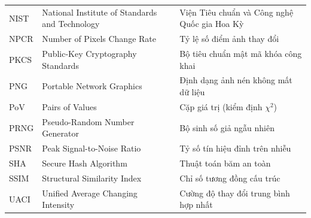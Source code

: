{\begin{longtable}{@{}P{2.6cm}P{6.4cm}P{6.0cm}@{}}
NIST    & National Institute of Standards and Technology & Viện Tiêu chuẩn và Công nghệ Quốc gia Hoa Kỳ\\
NPCR    & Number of Pixels Change Rate & Tỷ lệ số điểm ảnh thay đổi\\
PKCS    & Public-Key Cryptography Standards & Bộ tiêu chuẩn mật mã khóa công khai\\
PNG     & Portable Network Graphics & Định dạng ảnh nén không mất dữ liệu\\
PoV     & Pairs of Values & Cặp giá trị (kiểm định $\chi^2$)\\
PRNG    & Pseudo-Random Number Generator & Bộ sinh số giả ngẫu nhiên\\
PSNR    & Peak Signal-to-Noise Ratio & Tỷ số tín hiệu đỉnh trên nhiễu\\
SHA     & Secure Hash Algorithm & Thuật toán băm an toàn\\
SSIM    & Structural Similarity Index & Chỉ số tương đồng cấu trúc\\
UACI    & Unified Average Changing Intensity & Cường độ thay đổi trung bình hợp nhất\\
\end{longtable}}
